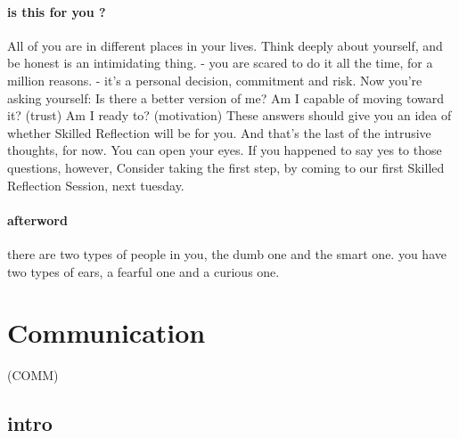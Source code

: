 \documentclass[
]{book}
\begin{document}
\hypertarget{is-this-for-you}{%
\subsubsection{is this for you ?}\label{is-this-for-you}}

All of you are in different places in your lives.
Think deeply about yourself, and
be honest is an intimidating thing.
- you are scared to do it all the time, for a million reasons.
- it's a personal decision, commitment and risk.
Now you're asking yourself:
Is there a better version of me?
Am I capable of moving toward it?
(trust) Am I ready to? (motivation)
These answers should give you an idea of whether
Skilled Reflection will be for you.
And that's the last of the intrusive thoughts,
for now.
You can open your eyes.
If you happened to say yes to those questions,
however,
Consider taking the first step,
by coming to our first Skilled Reflection Session,
next tuesday.

\hypertarget{afterword}{%
\subsubsection{afterword}\label{afterword}}

there are two types of people in you,
the dumb one and the smart one.
you have two types of ears,
a fearful one and a curious one.

\hypertarget{communication}{%
\chapter{Communication}\label{communication}}

(COMM)

\hypertarget{intro}{%
\section{intro}\label{intro}}
\end{document}
